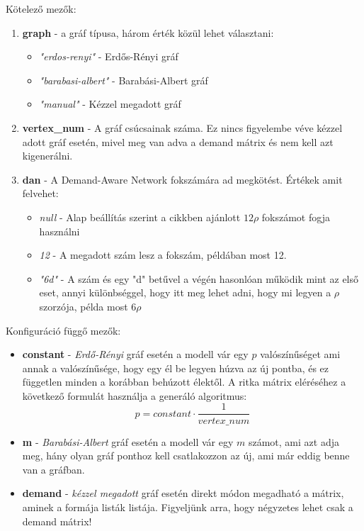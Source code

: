 \documentclass[12pt]{report}
\begin{document}
Kötelező mezők: 
\begin{enumerate}
	\item \textbf{graph} - a gráf típusa, három érték közül lehet választani:
	\begin{itemize}
		\item \textit{"erdos-renyi"} - Erdős-Rényi gráf 
		\item \textit{"barabasi-albert"} - Barabási-Albert gráf
		\item \textit{"manual"} - Kézzel megadott gráf
	\end{itemize}
	\item \textbf{vertex\_num} - A gráf csúcsainak száma. Ez nincs figyelembe véve kézzel adott gráf esetén, mivel meg van adva a demand mátrix és nem kell azt kigenerálni.
	\item \textbf{dan} - A Demand-Aware Network fokszámára ad megkötést. Értékek amit felvehet:
	\begin{itemize}
		\item \textit{null} - Alap beállítás szerint a cikkben ajánlott $12\rho$ fokszámot fogja használni
		\item \textit{12} - A megadott szám lesz a fokszám, példában most 12.
		\item \textit{"6d"} - A szám és egy "d" betűvel a végén hasonlóan működik mint az első eset, annyi különbséggel, hogy itt meg lehet adni, hogy mi legyen a $\rho$ szorzója, példa most $6\rho$
	\end{itemize}
\end{enumerate}

Konfiguráció függő mezők:
\begin{itemize}
	\item \textbf{constant} - \textit{Erdő-Rényi} gráf esetén a modell vár egy \(p\) valószínűséget ami annak a valószínűsége, hogy egy él be legyen húzva az új pontba, és ez független minden a korábban behúzott élektől. 
	A ritka mátrix eléréséhez a következő formulát használja a generáló algoritmus:  \[p = constant \cdot \frac{1}{vertex\_num}\]
	\item \textbf{m} - \textit{Barabási-Albert} gráf esetén a modell vár egy \(m\) számot, ami azt adja meg, hány olyan gráf ponthoz kell csatlakozzon az új, ami már eddig benne van a gráfban. 
	\item \textbf{demand} -  \textit{kézzel megadott} gráf esetén direkt módon megadható a mátrix, aminek a formája listák listája. 
	Figyeljünk arra, hogy négyzetes lehet csak a demand mátrix!
\end{itemize}
\end{document}
